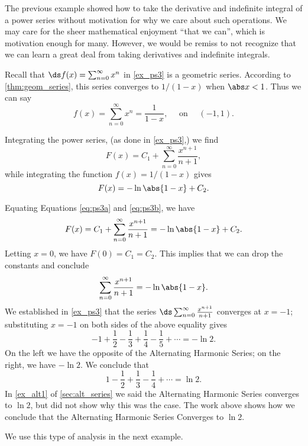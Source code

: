 The previous example showed how to take the derivative and indefinite integral of a power series without motivation for why we care about such operations. We may care for the sheer mathematical enjoyment ``that we can'', which is motivation enough for many. However, we would be remiss to not recognize that we can learn a great deal from taking derivatives and indefinite integrals.\bigskip

Recall that $\ds f(x) = \sum_{n=0}^\infty x^n$ in \autoref{ex_ps3} is a geometric series. According to \autoref{thm:geom_series}, this series converges to $1/(1-x)$ when $\abs x<1$. Thus we can say
\[f(x) = \sum_{n=0}^\infty x^n = \frac 1{1-x},\quad \text{ on }\quad (-1,1).\]

Integrating the power series, (as done in \autoref{ex_ps3},) we find
\begin{equation} F(x)  = C_1+\sum_{n=0}^\infty \frac{x^{n+1}}{n+1},\label{eq:ps3a}\end{equation}
while integrating the function $f(x) = 1/(1-x)$ gives
\begin{equation} F(x)  = -\ln\abs{1-x} + C_2.\label{eq:ps3b}\end{equation}

Equating Equations \eqref{eq:ps3a} and \eqref{eq:ps3b}, we have 
\[F(x) = C_1+\sum_{n=0}^\infty \frac{x^{n+1}}{n+1} = -\ln\abs{1-x} + C_2.\]
Letting $x=0$, we have $F(0) = C_1 = C_2$. This implies that we can drop the constants and conclude
\[\sum_{n=0}^\infty \frac{x^{n+1}}{n+1} = -\ln\abs{1-x}.\]
We established in \autoref{ex_ps3} that the series $\ds\sum_{n=0}^\infty \frac{x^{n+1}}{n+1}$ converges at $x=-1$; substituting $x=-1$ on both sides of the above equality gives
\[-1+\frac12-\frac13+\frac14-\frac15+\dotsb = -\ln 2.\]
On the left we have the opposite of the Alternating Harmonic Series; on the right, we have $-\ln 2$. We conclude that 
\[1-\frac12+\frac13-\frac14+\dotsb = \ln 2.\]
In \autoref{ex_alt1} of \autoref{sec:alt_series} we said the Alternating Harmonic Series converges to $\ln 2$, but did not show why this was the case. The work above shows how we conclude that the Alternating Harmonic Series Converges to $\ln 2$. 

We use this type of analysis in the next example.

